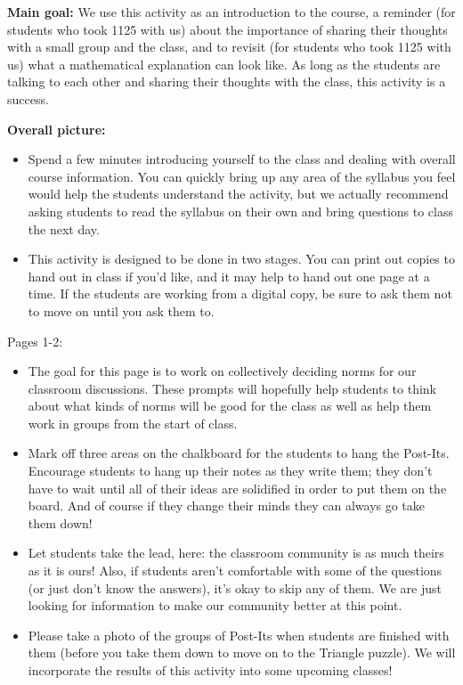 \documentclass {ximera}
\begin{document}
\begin{instructorNotes}


{\bf Main goal:} We use this activity as an introduction to the course, a reminder (for students who took 1125 with us) about the importance of sharing their thoughts with a small group and the class, and to revisit (for students who took 1125 with us) what a mathematical explanation can look like. As long as the students are talking to each other and sharing their thoughts with the class, this activity is a success.

{\bf Overall picture:} 
\begin{itemize}
	\item Spend a few minutes introducing yourself to the class and dealing with overall course information. You can quickly bring up any area of the syllabus you feel would help the students understand the activity, but we actually recommend asking students to read the syllabus on their own and bring questions to class the next day.
	\item This activity is designed to be done in two stages. You can print out copies to hand out in class if you'd like, and it may help to hand out one page at a time. If the students are working from a digital copy, be sure to ask them not to move on until you ask them to.
\end{itemize}
	
Pages 1-2:


\begin{itemize}
	\item The goal for this page is to work on collectively deciding norms for our classroom discussions. These prompts will hopefully help students to think about what kinds of norms will be good for the class as well as help them work in groups from the start of class.
	\item Mark off three areas on the chalkboard for the students to hang the Post-Its. Encourage students to hang up their notes as they write them; they don't have to wait until all of their ideas are solidified in order to put them on the board. And of course if they change their minds they can always go take them down!
	\item Let students take the lead, here: the classroom community is as much theirs as it is ours! Also, if students aren't comfortable with some of the questions (or just don't know the answers), it's okay to skip any of them. We are just looking for information to make our community better at this point.
	\item Please take a photo of the groups of Post-Its when students are finished with them (before you take them down to move on to the Triangle puzzle). We will incorporate the results of this activity into some upcoming classes!
\end{itemize}



\end{instructorNotes}
\end{document}
